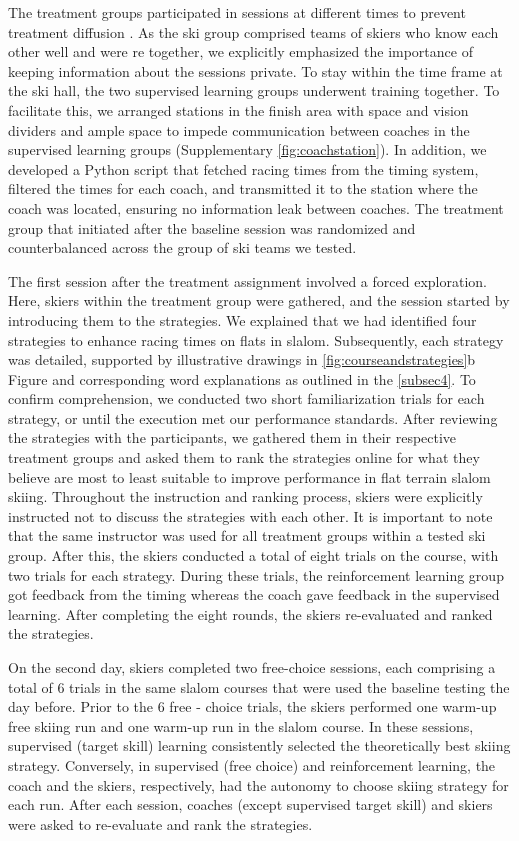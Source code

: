 \documentclass[pdflatex,sn-mathphys-num]{sn-jnl}%
\theoremstyle{thmstyleone}%
\theoremstyle{thmstyletwo}%
\theoremstyle{thmstylethree}%
\begin{document}
The treatment groups participated in sessions at different times to prevent treatment diffusion \cite{maxwell_designing_2017}. As the ski group comprised teams of skiers who know each other well and were re together, we explicitly emphasized the importance of keeping information about the sessions private. To stay within the time frame at the ski hall, the two supervised learning groups underwent training together. To facilitate this, we arranged stations in the finish area with space and vision dividers and ample space to impede communication between coaches in the supervised learning groups (Supplementary \ref{fig:coachstation}). In addition, we developed a Python script that fetched racing times from the timing system, filtered the times for each coach, and transmitted it to the station where the coach was located, ensuring no information leak between coaches. The treatment group that initiated after the baseline session was randomized and counterbalanced across the group of ski teams we tested.

The first session after the treatment assignment involved a forced exploration. Here, skiers within the treatment group were gathered, and the session started by introducing them to the strategies. We explained that we had identified four strategies to enhance racing times on flats in slalom. Subsequently, each strategy was detailed, supported by illustrative drawings in \ref{fig:courseandstrategies}b Figure and corresponding word explanations as outlined in the \ref{subsec4}. To confirm comprehension, we conducted two short familiarization trials for each strategy, or until the execution met our performance standards. After reviewing the strategies with the participants, we gathered them in their respective treatment groups and asked them to rank the strategies online for what they believe are most to least suitable to improve performance in flat terrain slalom skiing. Throughout the instruction and ranking process, skiers were explicitly instructed not to discuss the strategies with each other. It is important to note that the same instructor was used for all treatment groups within a tested ski group. After this, the skiers conducted a total of eight trials on the course, with two trials for each strategy. During these trials, the reinforcement learning group got feedback from the timing whereas the coach gave feedback in the supervised learning. After completing the eight rounds, the skiers re-evaluated and ranked the strategies.

On the second day, skiers completed two free-choice sessions, each comprising a total of 6 trials in the same slalom courses that were used the baseline testing the day before. Prior to the 6 free - choice trials, the skiers performed one warm-up free skiing run and one warm-up run in the slalom course. In these sessions, supervised (target skill) learning consistently selected the theoretically best skiing strategy. Conversely, in supervised (free choice) and reinforcement learning, the coach and the skiers, respectively, had the autonomy to choose skiing strategy for each run. After each session, coaches (except supervised target skill) and skiers were asked to re-evaluate and rank the strategies.
\end{document}
